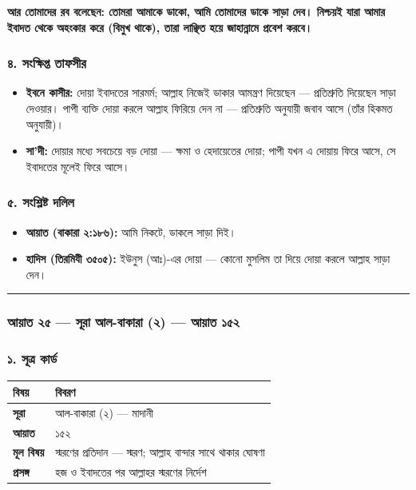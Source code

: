 \textbf{আর তোমাদের রব বলেছেন: তোমরা আমাকে ডাকো, আমি তোমাদের ডাকে সাড়া দেব। নিশ্চয়ই যারা আমার ইবাদত থেকে অহংকার করে (বিমুখ থাকে), তারা লাঞ্ছিত হয়ে জাহান্নামে প্রবেশ করবে।}

\subsubsection*{৪. সংক্ষিপ্ত তাফসীর}

\begin{itemize}
\item \textbf{ইবনে কাসীর:} দোয়া ইবাদতের সারমর্ম; আল্লাহ নিজেই ডাকার আমন্ত্রণ দিয়েছেন — প্রতিশ্রুতি দিয়েছেন সাড়া দেওয়ার। পাপী ব্যক্তি দোয়া করলে আল্লাহ ফিরিয়ে দেন না — প্রতিশ্রুতি অনুযায়ী জবাব আসে (তাঁর হিকমত অনুযায়ী)।
\item \textbf{সা'দী:} দোয়ার মধ্যে সবচেয়ে বড় দোয়া — ক্ষমা ও হেদায়েতের দোয়া; পাপী যখন এ দোয়ায় ফিরে আসে, সে ইবাদতের মূলেই ফিরে আসে।
\end{itemize}
\subsubsection*{৫. সংশ্লিষ্ট দলিল}

\begin{itemize}
\item \textbf{আয়াত (বাকারা ২:১৮৬):} আমি নিকটে, ডাকলে সাড়া দিই।
\item \textbf{হাদিস (তিরমিযী ৩৫০৫):} ইউনুস (আঃ)-এর দোয়া — কোনো মুসলিম তা দিয়ে দোয়া করলে আল্লাহ সাড়া দেন।
\end{itemize}
\medskip\hrule\medskip

\subsubsection*{আয়াত ২৫ — সূরা আল-বাকারা (২) — আয়াত ১৫২}

\subsubsection*{১. সূত্র কার্ড}

\begin{table}[h]\centering\small
\begin{tabular}{ll}
বিষয় & বিবরণ \\
\hline
\textbf{সূরা} & আল-বাকারা (২) — মাদানী \\
\textbf{আয়াত} & ১৫২ \\
\textbf{মূল বিষয়} & স্মরণের প্রতিদান — স্মরণ; আল্লাহ বান্দার সাথে থাকার ঘোষণা \\
\textbf{প্রসঙ্গ} & হজ ও ইবাদতের পর আল্লাহর স্মরণের নির্দেশ \\
\hline
\end{tabular}
\end{table}

